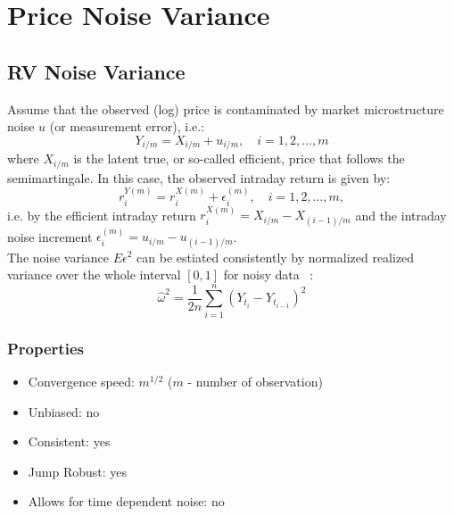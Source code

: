 \documentclass[letterpaper]{report}
\newcounter{N}
\begin{document}
\chapter{Price Noise Variance}
\thispagestyle{plain}
\section{RV Noise Variance}
Assume that the observed (log) price is contaminated by market microstructure
noise $u$ (or measurement error), i.e.:
\begin{equation}
Y_{i/m} = X_{i/m} + u_{i/m}, \quad i = 1,2,\ldots, m
\end{equation}
where $X_{i/m}$ is the latent true, or so-called efficient, price that follows
the semimartingale. In this case, the observed intraday return is given
by:
\begin{equation}
r_i^{Y(m)} = r_i^{X(m)} + \epsilon_{i}^{(m)}, \quad i= 1,2,\ldots, m,
\end{equation}
i.e. by the efficient intraday return $r_i^{X(m)} = X_{i/m} - X_{(i-1)/m}$ and the intraday
noise increment $\epsilon_i^{(m)} = u_{i/m} - u_{(i-1)/m}$.\\

\noindent The noise variance $E\epsilon^2$ can be estiated consistently by normalized
realized variance over the whole interval $[0,1]$ for noisy data
~\cite[Zhang et al., 2005]{Zhang_Mykland_Ait-Sahalia}:
\begin{equation}
\label{Noise_Variance}
\hat{\omega}^2=\frac{1}{2n}\sum_{i=1}^{n} (Y_{t_i} - Y_{t_{i-1}})^2
\end{equation}
\subsection{Properties}
\begin{itemize}
\item Convergence speed: $m^{1/2}$ ($m$ - number of observation)
\item Unbiased: no
\item Consistent: yes
\item Jump Robust: yes
\item Allows for time dependent noise: no
\end{itemize}
\end{document}
